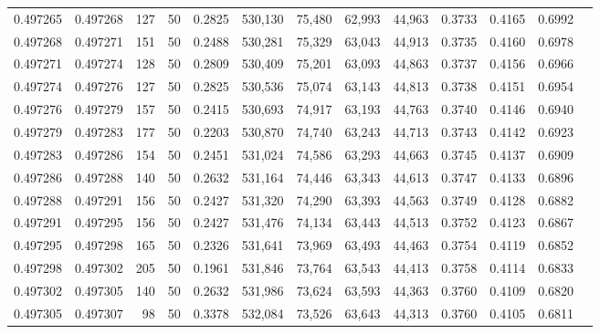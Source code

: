 \begin{tabular}{rrrrrrrrrrrrr}
0.497265 & 0.497268 &   127 &  50 &                                     0.2825 & 530,130 &  75,480 &  62,993 &  44,963 & 0.3733 & 0.4165 & 0.6992 \\
0.497268 & 0.497271 &   151 &  50 &                                     0.2488 & 530,281 &  75,329 &  63,043 &  44,913 & 0.3735 & 0.4160 & 0.6978 \\
0.497271 & 0.497274 &   128 &  50 &                                     0.2809 & 530,409 &  75,201 &  63,093 &  44,863 & 0.3737 & 0.4156 & 0.6966 \\
0.497274 & 0.497276 &   127 &  50 &                                     0.2825 & 530,536 &  75,074 &  63,143 &  44,813 & 0.3738 & 0.4151 & 0.6954 \\
0.497276 & 0.497279 &   157 &  50 &                                     0.2415 & 530,693 &  74,917 &  63,193 &  44,763 & 0.3740 & 0.4146 & 0.6940 \\
0.497279 & 0.497283 &   177 &  50 &                                     0.2203 & 530,870 &  74,740 &  63,243 &  44,713 & 0.3743 & 0.4142 & 0.6923 \\
0.497283 & 0.497286 &   154 &  50 &                                     0.2451 & 531,024 &  74,586 &  63,293 &  44,663 & 0.3745 & 0.4137 & 0.6909 \\
0.497286 & 0.497288 &   140 &  50 &                                     0.2632 & 531,164 &  74,446 &  63,343 &  44,613 & 0.3747 & 0.4133 & 0.6896 \\
0.497288 & 0.497291 &   156 &  50 &                                     0.2427 & 531,320 &  74,290 &  63,393 &  44,563 & 0.3749 & 0.4128 & 0.6882 \\
0.497291 & 0.497295 &   156 &  50 &                                     0.2427 & 531,476 &  74,134 &  63,443 &  44,513 & 0.3752 & 0.4123 & 0.6867 \\
0.497295 & 0.497298 &   165 &  50 &                                     0.2326 & 531,641 &  73,969 &  63,493 &  44,463 & 0.3754 & 0.4119 & 0.6852 \\
0.497298 & 0.497302 &   205 &  50 &                                     0.1961 & 531,846 &  73,764 &  63,543 &  44,413 & 0.3758 & 0.4114 & 0.6833 \\
0.497302 & 0.497305 &   140 &  50 &                                     0.2632 & 531,986 &  73,624 &  63,593 &  44,363 & 0.3760 & 0.4109 & 0.6820 \\
0.497305 & 0.497307 &    98 &  50 &                                     0.3378 & 532,084 &  73,526 &  63,643 &  44,313 & 0.3760 & 0.4105 & 0.6811 \\

\end{tabular}
